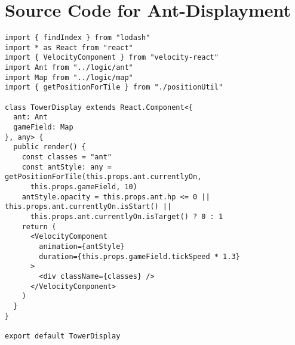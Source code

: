 \section{Source Code for Ant-Displayment}
\label{src:uiant}
\begin{lstlisting}
import { findIndex } from "lodash"
import * as React from "react"
import { VelocityComponent } from "velocity-react"
import Ant from "../logic/ant"
import Map from "../logic/map"
import { getPositionForTile } from "./positionUtil"

class TowerDisplay extends React.Component<{
  ant: Ant
  gameField: Map
}, any> {
  public render() {
    const classes = "ant"
    const antStyle: any = getPositionForTile(this.props.ant.currentlyOn,
      this.props.gameField, 10)
    antStyle.opacity = this.props.ant.hp <= 0 || this.props.ant.currentlyOn.isStart() ||
      this.props.ant.currentlyOn.isTarget() ? 0 : 1
    return (
      <VelocityComponent
        animation={antStyle}
        duration={this.props.gameField.tickSpeed * 1.3}
      >
        <div className={classes} />
      </VelocityComponent>
    )
  }
}

export default TowerDisplay

\end{lstlisting}

